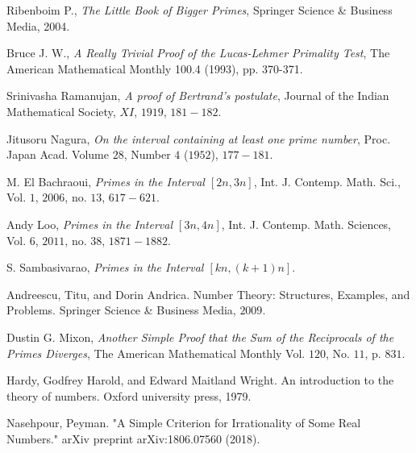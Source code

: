 \documentclass{subfiles}
\begin{document}
\begin{thebibliography}{99}
	 Ribenboim P., \textit{The Little Book of Bigger Primes}, Springer Science \& Business Media, 2004.
	
	 Bruce J. W., \textit{A Really Trivial Proof of the Lucas-Lehmer Primality Test}, The American Mathematical Monthly 100.4 (1993), pp. 370-371.
	
	 Srinivasha Ramanujan, \textit{A proof of Bertrand’s postulate}, Journal of the Indian Mathematical Society, $XI$, $1919$, $181-182$.
	
	 Jitusoru Nagura, \textit{On the interval containing at least one prime number}, Proc. Japan Acad. Volume $28$, Number $4$ ($1952$), $177-181$.
	
	 M. El Bachraoui, \textit{Primes in the Interval $[2n, 3n]$}, Int. J. Contemp. Math. Sci., Vol. $1$, $2006$, no. $13$, $617-621$.
	
	 Andy Loo, \textit{Primes in the Interval $[3n, 4n]$}, Int. J. Contemp. Math. Sciences, Vol. $6$, $2011$, no. $38$, $1871 - 1882$.
	
	 S. Sambasivarao, \textit{Primes in the Interval $[kn, (k+1)n]$}.
	
	 Andreescu, Titu, and Dorin Andrica. Number Theory: Structures, Examples, and Problems. Springer Science \& Business Media, $2009$.
	
	 Dustin G. Mixon, \textit{Another Simple Proof that the Sum of the Reciprocals of the Primes Diverges}, The American Mathematical Monthly Vol. $120$, No. $11$, p. $831$.
	
	
	 Hardy, Godfrey Harold, and Edward Maitland Wright. An introduction to the theory of numbers. Oxford university press, 1979.
	
	 Nasehpour, Peyman. "A Simple Criterion for Irrationality of Some Real Numbers." arXiv preprint arXiv:1806.07560 (2018).
\end{thebibliography}
\end{document}
